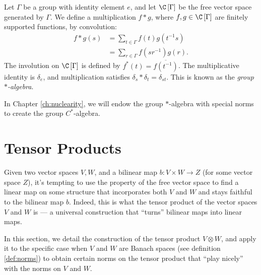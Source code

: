 \begin{definition}
  Let $\Gamma$ be a group with identity element $e$, and let $\C\left[\Gamma\right]$ be the free vector space generated by $\Gamma$. We define a multiplication $f \ast g$, where $f,g\in \C\left[\Gamma\right]$ are finitely supported functions, by convolution:
  \begin{align*}
    f\ast g(s) &= \sum_{t\in\Gamma}f(t)g\left(t^{-1}s\right)\\
               &= \sum_{r\in\Gamma}f\left(sr^{-1}\right)g\left(r\right).
  \end{align*}
  The involution on $\C\left[\Gamma\right]$ is defined by $f^{\ast}\left(t\right) = \overline{f\left(t^{-1}\right)}$. The multiplicative identity is $\delta_e$, and multiplication satisfies $\delta_s\ast \delta_t = \delta_{st}$. This is known as the \textit{group $\ast$-algebra}.
\end{definition}
\begin{remark}
  In Chapter \ref{ch:nuclearity}, we will endow the group $\ast$-algebra with special norms to create the group $C^{\ast}$-algebra.
\end{remark}
\section{Tensor Products}%
Given two vector spaces $V,W$, and a bilinear map $b\colon V\times W \rightarrow Z$ (for some vector space $Z$), it's tempting to use the property of the free vector space to find a linear map on some structure that incorporates both $V$ and $W$ and stays faithful to the bilinear map $b$. Indeed, this is what the tensor product of the vector spaces $V$ and $W$ is --- a universal construction that ``turns'' bilinear maps into linear maps.\newline

In this section, we detail the construction of the tensor product $V\otimes W$, and apply it to the specific case when $V$ and $W$ are Banach spaces (see definition \ref{def:norms}) to obtain certain norms on the tensor product that ``play nicely'' with the norms on $V$ and $W$.
